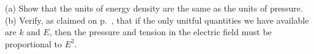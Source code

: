 (a) Show that the units of energy density are the same as the units of pressure.\\
(b) Verify, as claimed on p.~\pageref{claim-p-t-units}, that if the only unitful
quantities we have available are $k$ and $E$, then the pressure and tension in
the electric field must be proportional to $E^2$.
